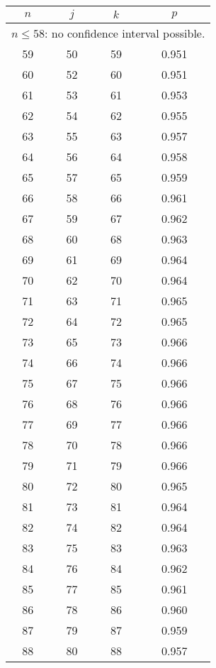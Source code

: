 \begin{table}\center \scriptsize
\hspace{2mm}
 \begin{tabular}{|c|c|c|c|}
 \hline $n$ & $j$ & $k$ & $p$ \\ \hline \hline
\multicolumn{4}{|c|}{
$n \leq 58 $: no confidence interval possible.}\\ \hline
 59  & 50  & 59 & 0.951  \\ \hline
 60  & 52  & 60 & 0.951  \\ \hline
 61  & 53  & 61 & 0.953  \\ \hline
 62  & 54  & 62 & 0.955  \\ \hline
 63  & 55  & 63 & 0.957  \\ \hline
 64  & 56  & 64 & 0.958  \\ \hline
 65  & 57  & 65 & 0.959  \\ \hline
 66  & 58  & 66 & 0.961  \\ \hline
 67  & 59  & 67 & 0.962  \\ \hline
 68  & 60  & 68 & 0.963  \\ \hline
 69  & 61  & 69 & 0.964  \\ \hline
 70  & 62  & 70 & 0.964  \\ \hline
 71  & 63  & 71 & 0.965  \\ \hline
 72  & 64  & 72 & 0.965  \\ \hline
 73  & 65  & 73 & 0.966  \\ \hline
 74  & 66  & 74 & 0.966  \\ \hline
 75  & 67  & 75 & 0.966  \\ \hline
 76  & 68  & 76 & 0.966  \\ \hline
 77  & 69  & 77 & 0.966  \\ \hline
 78  & 70  & 78 & 0.966  \\ \hline
 79  & 71  & 79 & 0.966  \\ \hline
 80  & 72  & 80 & 0.965  \\ \hline
 81  & 73  & 81 & 0.964  \\ \hline
 82  & 74  & 82 & 0.964  \\ \hline
 83  & 75  & 83 & 0.963  \\ \hline
 84  & 76  & 84 & 0.962  \\ \hline
 85  & 77  & 85 & 0.961  \\ \hline
 86  & 78  & 86 & 0.960  \\ \hline
 87  & 79  & 87 & 0.959  \\ \hline
 88  & 80  & 88 & 0.957  \\ \hline

\end{tabular}
\end{table}
